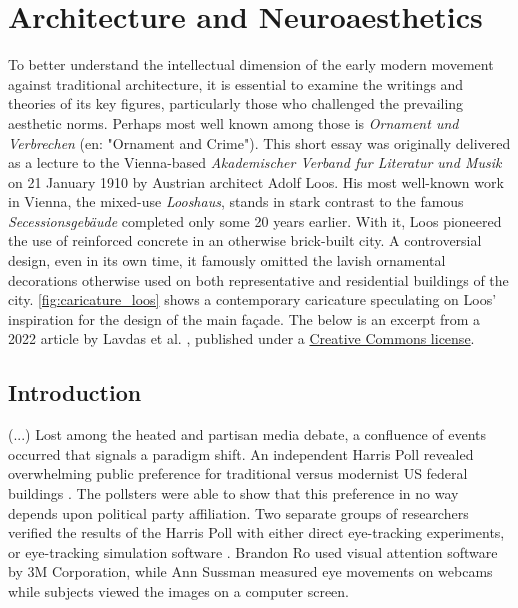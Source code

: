 \documentclass[a4paper]{article}
\begin{document}
\clearpage
\section{Architecture and Neuroaesthetics}

\begin{mdframed}[linewidth=1pt, roundcorner=5pt, innerleftmargin=10pt, innerrightmargin=10pt, innertopmargin=10pt, innerbottommargin=10pt, linecolor=black, backgroundcolor=white, userdefinedwidth=\textwidth]
    To better understand the intellectual dimension of the early modern movement against traditional architecture, it is essential to examine the writings and theories of its key figures, particularly those who challenged the prevailing aesthetic norms. Perhaps most well known among those is \textit{Ornament und Verbrechen} \cite{loos_ornament_1908} (en: "Ornament and Crime"). This short essay was originally delivered as a lecture to the Vienna-based \textit{Akademischer Verband fur Literatur und Musik} on 21 January 1910 by Austrian architect Adolf Loos. His most well-known work in Vienna, the mixed-use \textit{Looshaus}, stands in stark contrast to the famous \textit{Secessionsgebäude} completed only some 20 years earlier. With it, Loos pioneered the use of reinforced concrete in an otherwise brick-built city. A controversial design, even in its own time, it famously omitted the lavish ornamental decorations otherwise used on both representative and residential buildings of the city. \cref{fig:caricature_loos} shows a contemporary caricature speculating on Loos' inspiration for the design of the main façade. The below is an excerpt from a 2022 article by Lavdas et al. \cite{lavdas_architectural_2022}, published under a \href{https://creativecommons.org/licenses/by/4.0/}{Creative Commons license}.
\end{mdframed}

\subsection{Introduction}

(...) Lost among the heated and partisan media debate, a confluence of events occurred that signals a paradigm shift. An independent Harris Poll revealed overwhelming public preference for traditional versus modernist US federal buildings \cite{noauthor_americans_2020}. The pollsters were able to show that this preference in no way depends upon political party affiliation. Two separate groups of researchers verified the results of the Harris Poll with either direct eye-tracking experiments, or eye-tracking simulation software \cite{huffman_modern_2022}\cite{design_study-1_2022}. Brandon Ro used visual attention software by 3M Corporation, while Ann Sussman measured eye movements on webcams while subjects viewed the images on a computer screen.
\end{document}
